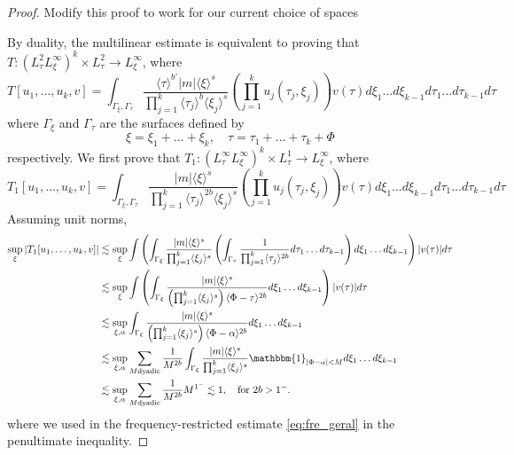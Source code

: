 \documentclass[a4paper, 11pt]{amsart}
\newcommand{\jap}[1]{\langle #1 \rangle}
\theoremstyle{plain}
\theoremstyle{definition}
\theoremstyle{remark}
\newcommand{\5}{\text{V}}
\numberwithin{equation}{section}
\theoremstyle{mytheoremstyle} \newtheorem{nota}[thm]{Remark}
\theoremstyle{mytheoremstyle} \newtheorem{exemplo}[thm]{Example}
\newcommand{\red}{\color{red}}
\newcommand{\blue}{\color{blue}}
\begin{document}
\begin{proof}

\red Modify this proof to work for our current choice of spaces

\blue
	By duality, the multilinear estimate is equivalent to proving that $T:(L^2_\tau L^\infty_\xi)^k \times L^2_\tau \to L^\infty_\xi$, where
	$$
	T[u_1,\dots, u_k,v]=\int_{\Gamma_\xi, \Gamma_\tau} \frac{\jap{\tau}^{b'}|m|\jap{\xi}^s}{\prod_{j=1}^k\jap{\tau_j}^b\jap{\xi_j}^s}\left(\prod_{j=1}^ku_j(\tau_j,\xi_j)\right)v(\tau)d\xi_1\dots d\xi_{k-1}d\tau_1\dots d\tau_{k-1}d\tau
	$$
	where $\Gamma_\xi$ and $\Gamma_\tau$ are the surfaces defined by
	$$
	\xi=\xi_1+\dots + \xi_k,\quad \tau=\tau_1+\dots + \tau_k + \Phi
	$$
	respectively. We first prove that $T_1:(L^\infty_\tau L^\infty_\xi)^k \times L^1_\tau \to L^\infty_\xi$, where
	$$
	T_1[u_1,\dots, u_k,v]=\int_{\Gamma_\xi, \Gamma_\tau} \frac{|m|\jap{\xi}^s}{\prod_{j=1}^k\jap{\tau_j}^{2b}\jap{\xi_j}^s}\left(\prod_{j=1}^ku_j(\tau_j,\xi_j)\right)v(\tau)d\xi_1\dots d\xi_{k-1}d\tau_1\dots d\tau_{k-1}d\tau
	$$
	Assuming unit norms,
	\begin{align*}
		\sup_\xi |T_1[u_1,\dots, u_k,v]|& \lesssim \sup_\xi \int \left(\int_{\Gamma_\xi} \frac{|m|\jap{\xi}^s}{\prod_{j=1}^k\jap{\xi_j}^s} \left(\int_{\Gamma_\tau}\frac{1}{\prod_{j=1}^k\jap{\tau_j}^{2b}} d\tau_1\dots  d\tau_{k-1}\right)d\xi_1\dots d\xi_{k-1}\right) |v(\tau)| d\tau \\&\lesssim \sup_\xi \int\left(\int_{\Gamma_\xi} \frac{|m|\jap{\xi}^s}{\left(\prod_{j=1}^k\jap{\xi_j}^s\right)\jap{\Phi-\tau}^{2b}} d\xi_1 \dots d\xi_{k-1} \right) |v(\tau)|d\tau \\&\lesssim \sup_{\xi,\alpha} \int_{\Gamma_\xi} \frac{|m|\jap{\xi}^s}{\left(\prod_{j=1}^k\jap{\xi_j}^s\right)\jap{\Phi-\alpha}^{2b}} d\xi_1 \dots d\xi_{k-1}\\&\lesssim \sup_{\xi,\alpha} \sum_{M \text{dyadic}} \frac{1}{M^{2b}}\int_{\Gamma_\xi} \frac{|m|\jap{\xi}^s}{\prod_{j=1}^k\jap{\xi_j}^s}\mathbbm{1}_{|\Phi-\alpha|<M} d\xi_1\dots d\xi_{k-1} \\&\lesssim \sup_{\xi,\alpha} \sum_{M \text{dyadic}} \frac{1}{M^{2b}}M^{1^-} \lesssim 1,\quad \mbox{for }2b>1^-.
	\end{align*}
where we used in the frequency-restricted estimate \eqref{eq:fre_geral} in the penultimate inequality.


\end{proof}
\end{document}
